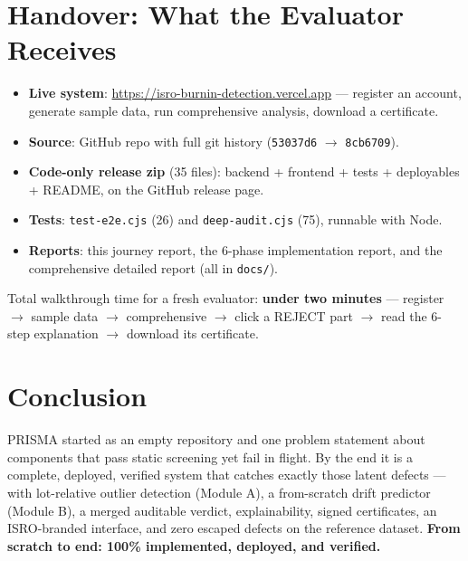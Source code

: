 \documentclass[11pt,a4paper]{article}
\newcommand{\code}[1]{\texttt{\small #1}}
\begin{document}
\section{Handover: What the Evaluator Receives}

\begin{itemize}[leftmargin=1.5em]
  \item \textbf{Live system}: \url{https://isro-burnin-detection.vercel.app} --- register an
        account, generate sample data, run comprehensive analysis, download a certificate.
  \item \textbf{Source}: GitHub repo with full git history (\code{53037d6} $\rightarrow$
        \code{8cb6709}).
  \item \textbf{Code-only release zip} (35 files): backend + frontend + tests + deployables +
        README, on the GitHub release page.
  \item \textbf{Tests}: \code{test-e2e.cjs} (26) and \code{deep-audit.cjs} (75), runnable with Node.
  \item \textbf{Reports}: this journey report, the 6-phase implementation report, and the
        comprehensive detailed report (all in \code{docs/}).
\end{itemize}

\noindent Total walkthrough time for a fresh evaluator: \textbf{under two minutes} --- register
$\rightarrow$ sample data $\rightarrow$ comprehensive $\rightarrow$ click a REJECT part
$\rightarrow$ read the 6-step explanation $\rightarrow$ download its certificate.

\section{Conclusion}

\noindent PRISMA started as an empty repository and one problem statement about components that
pass static screening yet fail in flight. By the end it is a complete, deployed, verified system
that catches exactly those latent defects --- with lot-relative outlier detection (Module A), a
from-scratch drift predictor (Module B), a merged auditable verdict, explainability, signed
certificates, an ISRO-branded interface, and zero escaped defects on the reference dataset.
\textbf{From scratch to end: 100\% implemented, deployed, and verified.}
\end{document}
